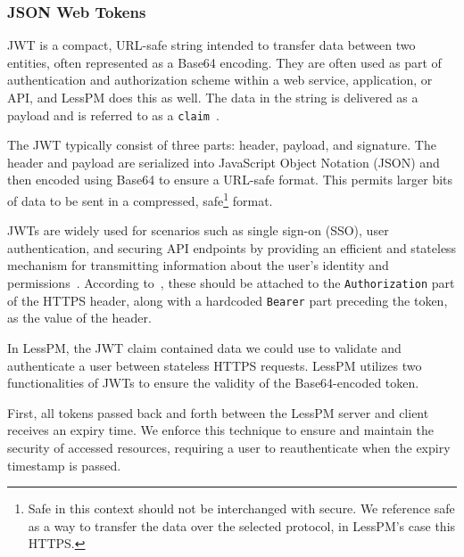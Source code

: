 \subsubsection{JSON Web Tokens}
JWT is a compact, URL-safe string intended to transfer data between two
entities, often represented as a Base64 encoding.
They are often used as part of authentication and authorization scheme within
a web service, application, or API, and LessPM does this as well.
The data in the string is delivered as a payload and is referred to as a
\texttt{claim}~\cite{RFC7519}.

The JWT typically consist of three parts: header, payload, and signature.
The header and payload are serialized into JavaScript Object Notation (JSON)
and then encoded using Base64 to ensure a URL-safe format.
This permits larger bits of data to be sent in a compressed, safe\footnote{
  Safe in this context should not be interchanged with secure.
  We reference safe as a way to transfer the data over the selected protocol,
  in LessPM's case this HTTPS.
} format.

JWTs are widely used for scenarios such as single sign-on (SSO), user
authentication, and securing API endpoints by providing an efficient and
stateless mechanism for transmitting information about the user's identity
and permissions~\cite{karande2018securingnode}.
According to~\cite{RFC7519}, these should be attached to the
\texttt{Authorization} part of the HTTPS header, along with a hardcoded
\texttt{Bearer} part preceding the token, as the value of the header.

In LessPM, the JWT claim contained data we could use to validate and
authenticate a user between stateless HTTPS requests.
LessPM utilizes two functionalities of JWTs to ensure the validity of the
Base64-encoded token.

First, all tokens passed back and forth between the LessPM server and client
receives an expiry time.
We enforce this technique to ensure and maintain the security of accessed
resources, requiring a user to reauthenticate when the expiry timestamp is
passed.


